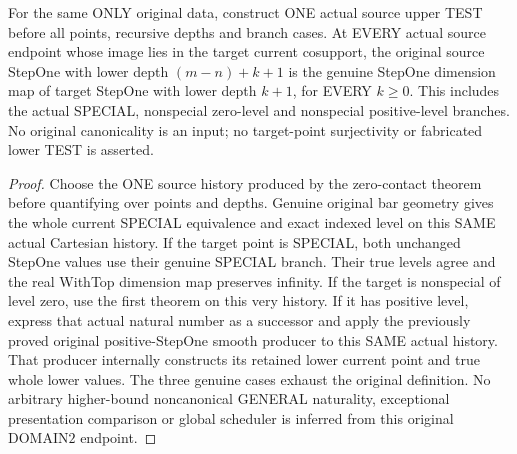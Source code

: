 \begin{theorem}
\label{hir:original-domain-two-all-stepone-all-smooth-values}
\leanok
For the same ONLY original data, construct ONE actual source upper TEST
before all points, recursive depths and branch cases. At EVERY actual source
endpoint whose image lies in the target current cosupport, the original
source StepOne with lower depth $(m-n)+k+1$ is the genuine StepOne dimension
map of target StepOne with lower depth $k+1$, for EVERY $k\ge0$. This includes
the actual SPECIAL, nonspecial zero-level and nonspecial positive-level
branches. No original canonicality is an input; no target-point surjectivity
or fabricated lower TEST is asserted.
\end{theorem}
\begin{proof}
Choose the ONE source history produced by the zero-contact theorem before
quantifying over points and depths. Genuine original bar geometry gives the
whole current SPECIAL equivalence and exact indexed level on this SAME
actual Cartesian history. If the target point is SPECIAL, both unchanged
StepOne values use their genuine SPECIAL branch. Their true levels agree
and the real WithTop dimension map preserves infinity. If the target is
nonspecial of level zero, use the first theorem on this very history. If it
has positive level, express that actual natural number as a successor and
apply the previously proved original positive-StepOne smooth producer to
this SAME actual history. That producer internally constructs its retained
lower current point and true whole lower values. The three genuine cases
exhaust the original definition. No arbitrary higher-bound noncanonical
GENERAL naturality, exceptional presentation comparison or global scheduler
is inferred from this original DOMAIN$2$ endpoint.
\end{proof}
